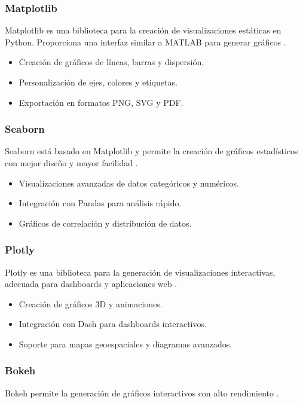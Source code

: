 \subsubsection{Matplotlib}
Matplotlib es una biblioteca para la creación de visualizaciones estáticas en Python. Proporciona una interfaz similar a MATLAB para generar gráficos \cite{hunter2007matplotlib}.

\begin{itemize}
	\item Creación de gráficos de líneas, barras y dispersión.
	\item Personalización de ejes, colores y etiquetas.
	\item Exportación en formatos PNG, SVG y PDF.
\end{itemize}

\subsubsection{Seaborn}
Seaborn está basado en Matplotlib y permite la creación de gráficos estadísticos con mejor diseño y mayor facilidad \cite{waskom2021seaborn}.

\begin{itemize}
	\item Visualizaciones avanzadas de datos categóricos y numéricos.
	\item Integración con Pandas para análisis rápido.
	\item Gráficos de correlación y distribución de datos.
\end{itemize}

\subsubsection{Plotly}
Plotly es una biblioteca para la generación de visualizaciones interactivas, adecuada para dashboards y aplicaciones web \cite{plotly2021}.

\begin{itemize}
	\item Creación de gráficos 3D y animaciones.
	\item Integración con Dash para dashboards interactivos.
	\item Soporte para mapas geoespaciales y diagramas avanzados.
\end{itemize}

\subsubsection{Bokeh}
Bokeh permite la generación de gráficos interactivos con alto rendimiento \cite{bokeh2018}.

